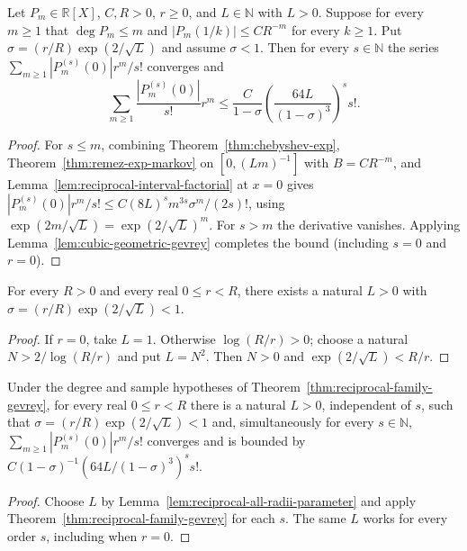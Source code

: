 \begin{theorem}
\label{thm:reciprocal-family-gevrey}
\leanok
{}
Let $P_m\in\mathbb R[X]$, $C,R>0$, $r\ge0$, and $L\in\mathbb N$ with $L>0$.
Suppose for every $m\ge1$ that $\deg P_m\le m$ and
$|P_m(1/k)|\le C R^{-m}$ for every $k\ge1$.
Put $\sigma=(r/R)\exp(2/\sqrt L)$ and assume $\sigma<1$.
Then for every $s\in\mathbb N$ the series
$\sum_{m\ge1}|P_m^{(s)}(0)|r^m/s!$ converges and
\[
\sum_{m\ge1}\frac{|P_m^{(s)}(0)|}{s!}r^m
\le \frac{C}{1-\sigma}
  \left(\frac{64L}{(1-\sigma)^3}\right)^s s!.
\]
\end{theorem}
\begin{proof}
For $s\le m$, combining Theorem~\ref{thm:chebyshev-exp}, Theorem~\ref{thm:remez-exp-markov} on $[0, (Lm)^{-1}]$ with $B = C R^{-m}$, and Lemma~\ref{lem:reciprocal-interval-factorial} at $x=0$ gives
$|P_m^{(s)}(0)|r^m/s!\le C(8L)^s m^{3s}\sigma^m/(2s)!$, using $\exp(2m/\sqrt L)=\exp(2/\sqrt L)^m$.
For $s>m$ the derivative vanishes. Applying
Lemma~\ref{lem:cubic-geometric-gevrey} completes the bound (including $s=0$ and $r=0$).
\end{proof}

\begin{lemma}
\label{lem:reciprocal-all-radii-parameter}
\leanok
For every $R>0$ and every real $0\le r<R$, there exists a natural
$L>0$ with $\sigma=(r/R)\exp(2/\sqrt L)<1$.
\end{lemma}
\begin{proof}
If $r=0$, take $L=1$. Otherwise $\log(R/r)>0$; choose a natural
$N>2/\log(R/r)$ and put $L=N^2$. Then $N>0$ and
$\exp(2/\sqrt L)<R/r$.
\end{proof}

\begin{theorem}
\label{thm:reciprocal-family-all-radii}
\leanok
{}
Under the degree and sample hypotheses of
Theorem~\ref{thm:reciprocal-family-gevrey}, for every real $0\le r<R$
there is a natural $L>0$, independent of $s$, such that
$\sigma=(r/R)\exp(2/\sqrt L)<1$ and, simultaneously for every $s\in\mathbb N$,
$\sum_{m\ge1}|P_m^{(s)}(0)|r^m/s!$ converges and is bounded by
$C(1-\sigma)^{-1}(64L/(1-\sigma)^3)^s s!$.
\end{theorem}
\begin{proof}
Choose $L$ by Lemma~\ref{lem:reciprocal-all-radii-parameter} and apply Theorem~\ref{thm:reciprocal-family-gevrey}
for each $s$. The same $L$ works for every order $s$, including when $r=0$.
\end{proof}

